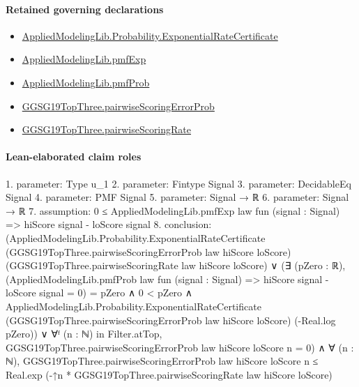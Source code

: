 \documentclass[10pt]{article}
\begin{document}
\paragraph{Retained governing declarations}
\begin{itemize}\raggedright
\item \hyperlink{governing-declaration-330a08568e50e95e}{Applied\allowbreak{}Modeling\allowbreak{}Lib.\allowbreak{}Probability.\allowbreak{}Exponential\allowbreak{}Rate\allowbreak{}Certificate}
\item \hyperlink{governing-declaration-8e4b4389a4f6454b}{Applied\allowbreak{}Modeling\allowbreak{}Lib.\allowbreak{}pmf\allowbreak{}Exp}
\item \hyperlink{governing-declaration-9c38d53b9d664221}{Applied\allowbreak{}Modeling\allowbreak{}Lib.\allowbreak{}pmf\allowbreak{}Prob}
\item \hyperlink{governing-declaration-4a5a5a764b383123}{GGSG19\allowbreak{}Top\allowbreak{}Three.\allowbreak{}pairwise\allowbreak{}Scoring\allowbreak{}Error\allowbreak{}Prob}
\item \hyperlink{governing-declaration-e33f15f580bb4893}{GGSG19\allowbreak{}Top\allowbreak{}Three.\allowbreak{}pairwise\allowbreak{}Scoring\allowbreak{}Rate}
\end{itemize}
\paragraph{Lean-elaborated claim roles}\begin{ReviewVerbatim}
1. parameter: Type u_1
2. parameter: Fintype Signal
3. parameter: DecidableEq Signal
4. parameter: PMF Signal
5. parameter: Signal → ℝ
6. parameter: Signal → ℝ
7. assumption: 0 ≤ AppliedModelingLib.pmfExp law fun (signal : Signal) => hiScore signal - loScore signal
8. conclusion: (AppliedModelingLib.Probability.ExponentialRateCertificate (GGSG19TopThree.pairwiseScoringErrorProb law hiScore loScore)
      (GGSG19TopThree.pairwiseScoringRate law hiScore loScore) ∨
    (∃ (pZero : ℝ),
        (AppliedModelingLib.pmfProb law fun (signal : Signal) => hiScore signal - loScore signal = 0) = pZero ∧
          0 < pZero ∧
            AppliedModelingLib.Probability.ExponentialRateCertificate
              (GGSG19TopThree.pairwiseScoringErrorProb law hiScore loScore) (-Real.log pZero)) ∨
      ∀ᶠ (n : ℕ) in Filter.atTop, GGSG19TopThree.pairwiseScoringErrorProb law hiScore loScore n = 0) ∧
  ∀ (n : ℕ),
    GGSG19TopThree.pairwiseScoringErrorProb law hiScore loScore n ≤
      Real.exp (-↑n * GGSG19TopThree.pairwiseScoringRate law hiScore loScore)
\end{ReviewVerbatim}
\end{document}
